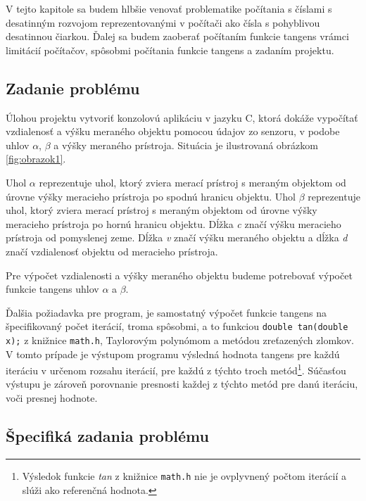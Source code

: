 \documentclass[12pt,a4paper,titlepage,final]{article}
\begin{document}
V tejto kapitole sa budem hlbšie venovať problematike počítania s číslami s desatinným rozvojom reprezentovanými v počítači ako čísla s pohyblivou desatinnou čiarkou. Ďalej sa budem zaoberať počítaním funkcie tangens vrámci limitácií počítačov, spôsobmi počítania funkcie tangens a zadaním projektu.

\subsection{Zadanie problému}

Úlohou projektu vytvoriť konzolovú aplikáciu v jazyku C, ktorá dokáže vypočítať vzdialenosť a výšku meraného objektu pomocou údajov zo senzoru, v podobe uhlov $\alpha$, $\beta$ a výšky meraného prístroja. Situácia je ilustrovaná obrázkom \ref{fig:obrazok1}.
 
Uhol $\alpha$ reprezentuje uhol, ktorý zviera merací prístroj s meraným objektom od úrovne výšky meracieho prístroja po spodnú hranicu objektu. Uhol $\beta$ reprezentuje uhol, ktorý zviera merací prístroj s meraným objektom od úrovne výšky meracieho prístroja po hornú hranicu objektu. Dĺžka \textit{c} značí výšku meracieho prístroja od pomyslenej zeme. Dĺžka \textit{v} značí výšku meraného objektu a dĺžka \textit{d} značí vzdialenosť objektu od meracieho prístroja.

Pre výpočet vzdialenosti a výšky meraného objektu budeme potrebovať výpočet funkcie tangens uhlov $\alpha$ a $\beta$. 


Ďalšia požiadavka pre program, je samostatný výpočet funkcie tangens na špecifikovaný počet iterácií, troma spôsobmi, a to funkciou \texttt{double tan(double x);} z knižnice \texttt{math.h}, Taylorovým polynómom a metódou zreťazených zlomkov. V tomto prípade je výstupom programu výsledná hodnota tangens pre každú iteráciu v určenom rozsahu iterácií, pre každú z týchto troch metód\footnote{Výsledok funkcie \textit{tan} z knižnice \texttt{math.h} nie je ovplyvnený počtom iterácií a slúži ako referenčná hodnota.}. Súčasťou výstupu je zároveň porovnanie presnosti každej z týchto metód pre danú iteráciu, voči presnej hodnote.

\subsection{Špecifiká zadania problému}\label{specifikacia}
\end{document}

